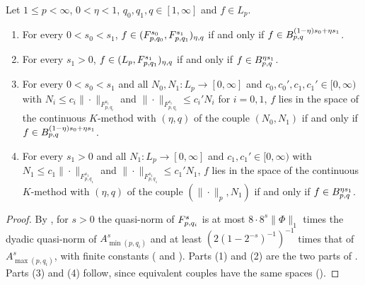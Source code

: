 \begin{theorem}
\label{thm:tl-interpolate}
\leanok
{}
Let $1 \leq p < \infty$, $0 < \eta < 1$, $q_0, q_1, q \in [1, \infty]$ and $f \in L_p$.
\begin{enumerate}
  \item For every $0 < s_0 < s_1$, $f \in (F^{s_0}_{p,q_0}, F^{s_1}_{p,q_1})_{\eta, q}$ if and
    only if $f \in B^{(1 - \eta) s_0 + \eta s_1}_{p,q}$.
  \item For every $s_1 > 0$, $f \in (L_p, F^{s_1}_{p,q_1})_{\eta, q}$ if and only if
    $f \in B^{\eta s_1}_{p,q}$.
  \item For every $0 < s_0 < s_1$ and all $N_0, N_1 : L_p \to [0, \infty]$ and
    $c_0, c_0', c_1, c_1' \in [0, \infty)$ with $N_i \leq c_i \|\cdot\|_{F^{s_i}_{p,q_i}}$ and
    $\|\cdot\|_{F^{s_i}_{p,q_i}} \leq c_i' N_i$ for $i = 0, 1$, $f$ lies in the space of the
    continuous $K$-method with $(\eta, q)$ of the couple $(N_0, N_1)$ if and only if
    $f \in B^{(1 - \eta) s_0 + \eta s_1}_{p,q}$.
  \item For every $s_1 > 0$ and all $N_1 : L_p \to [0, \infty]$ and $c_1, c_1' \in [0, \infty)$
    with $N_1 \leq c_1 \|\cdot\|_{F^{s_1}_{p,q_1}}$ and
    $\|\cdot\|_{F^{s_1}_{p,q_1}} \leq c_1' N_1$, $f$ lies in the space of the continuous
    $K$-method with $(\eta, q)$ of the couple $(\|\cdot\|_p, N_1)$ if and only if
    $f \in B^{\eta s_1}_{p,q}$.
\end{enumerate}
\end{theorem}

\begin{proof}
\leanok
By , for $s > 0$ the quasi-norm of $F^{s}_{p,q_i}$ is at most
$8 \cdot 8^s \|\Phi\|_1$ times the dyadic quasi-norm of $A^s_{\min(p,q_i)}$ and at least
$(2 (1 - 2^{-s})^{-1})^{-1}$ times that of $A^s_{\max(p,q_i)}$, with finite constants
( and ). Parts (1) and (2) are the two parts of
. Parts (3) and (4) follow, since equivalent couples have
the same spaces ().
\end{proof}

